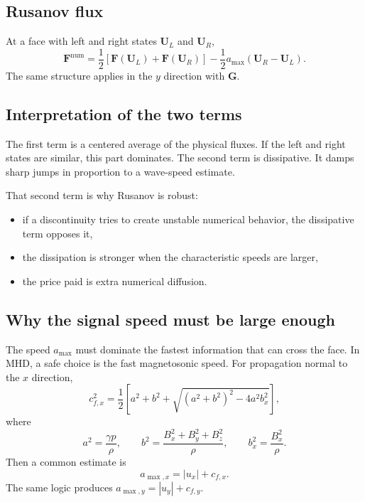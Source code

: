 \documentclass[11pt]{article}
\newcommand{\Uvec}{\mathbf{U}}
\newcommand{\Fvec}{\mathbf{F}}
\newcommand{\Gvec}{\mathbf{G}}
\begin{document}
\subsection{Rusanov flux}
At a face with left and right states $\Uvec_L$ and $\Uvec_R$,
\begin{equation}
\Fvec^{\mathrm{num}}
=
\frac12\left[\Fvec(\Uvec_L)+\Fvec(\Uvec_R)\right]
-
\frac12 a_{\max}(\Uvec_R-\Uvec_L).
\label{eq:m4-rusanov}
\end{equation}
The same structure applies in the $y$ direction with $\Gvec$.

\subsection{Interpretation of the two terms}
The first term is a centered average of the physical fluxes. If the left and right states are similar, this part dominates. The second term is dissipative. It damps sharp jumps in proportion to a wave-speed estimate.

That second term is why Rusanov is robust:
\begin{itemize}[leftmargin=1.8em]
    \item if a discontinuity tries to create unstable numerical behavior, the dissipative term opposes it,
    \item the dissipation is stronger when the characteristic speeds are larger,
    \item the price paid is extra numerical diffusion.
\end{itemize}

\subsection{Why the signal speed must be large enough}
The speed $a_{\max}$ must dominate the fastest information that can cross the face. In MHD, a safe choice is the fast magnetosonic speed. For propagation normal to the $x$ direction,
\begin{equation}
c_{f,x}^{2}
=
\frac12\left[
a^{2}+b^{2}
+
\sqrt{(a^{2}+b^{2})^{2}-4a^{2}b_x^{2}}
\right],
\label{eq:m4-cfx}
\end{equation}
where
\begin{equation}
a^{2}=\frac{\gamma p}{\rho},
\qquad
b^{2}=\frac{B_x^{2}+B_y^{2}+B_z^{2}}{\rho},
\qquad
b_x^{2}=\frac{B_x^{2}}{\rho}.
\label{eq:m4-soundmag}
\end{equation}
Then a common estimate is
\begin{equation}
a_{\max,x}=|u_x|+c_{f,x}.
\label{eq:m4-amaxx}
\end{equation}
The same logic produces $a_{\max,y}=|u_y|+c_{f,y}$.
\end{document}
